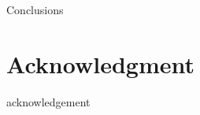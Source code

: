 \documentclass[conference,letterpaper]{IEEEtran}
\begin{document}
Conclusions

\section*{Acknowledgment}

acknowledgement






%
%
\end{document}
